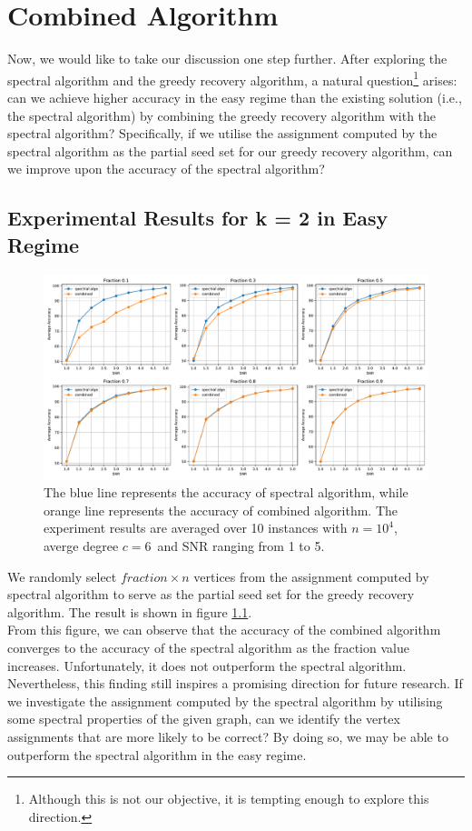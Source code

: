 \chapter{Combined Algorithm} \label{chapter 4}
Now, we would like to take our discussion one step further. After exploring the spectral algorithm and the greedy recovery algorithm, a natural question\footnote{Although this is not our objective, it is tempting enough to explore this direction.} arises: can we achieve higher accuracy in the easy regime than the existing solution (i.e., the spectral algorithm) by combining the greedy recovery algorithm with the spectral algorithm? Specifically, if we utilise the assignment computed by the spectral algorithm as the partial seed set for our greedy recovery algorithm, can we improve upon the accuracy of the spectral algorithm?\\ 
\section{Experimental Results for k = 2 in Easy Regime}
\begin{figure}[ht]
    \centering
    \includegraphics[width=1\linewidth]{Figures/combined_fitting_2.pdf}
    \caption[Comparison of Combined Algorithm and Spectral Algorithm]{The blue line represents the accuracy of spectral algorithm, while orange line represents the accuracy of combined algorithm. The experiment results are averaged over 10 instances with $n=10^4$, averge degree $c=6$\protect\footnotemark~and SNR ranging from 1 to 5.}
    \label{fig:combined}
\end{figure}
We randomly select $fraction\times n$ vertices from the assignment computed by spectral algorithm to serve as the partial seed set for the greedy recovery algorithm.  The result is shown in figure \ref{fig:combined}.\\
From this figure, we can observe that the accuracy of the combined algorithm converges to the accuracy of the spectral algorithm as the fraction value increases. Unfortunately, it does not outperform the spectral algorithm. Nevertheless, this finding still inspires a promising direction for future research. If we investigate the assignment computed by the spectral algorithm by utilising some spectral properties of the given graph, can we identify the vertex assignments that are more likely to be correct? By doing so, we may be able to outperform the spectral algorithm in the easy regime.
